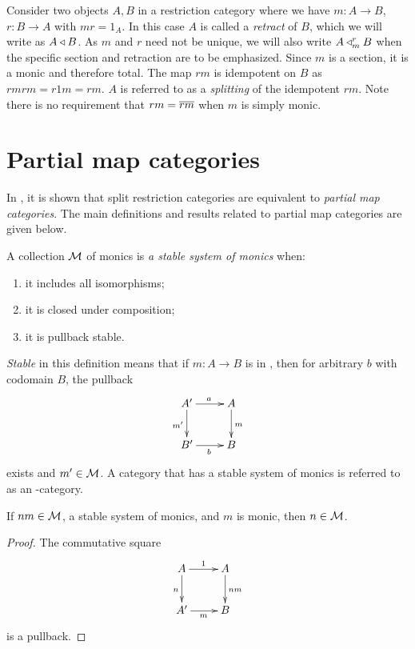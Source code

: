 Consider two objects $A, B$
in a restriction category where we have $m: A\to B$, $r:B \to A$ with $m r = 1_A$. In this case
$A$ is called a \emph{retract} of $B$, which we will write as $A\triangleleft B$. As $m$ and $r$ need
not be unique, we will also write $A \triangleleft_{m}^{r} B$ when the specific section and retraction
are to be emphasized. Since $m$ is a section, it is a monic and therefore total. The map $r m$ is
idempotent on $B$ as $r m r m = r 1 m = r m$. $A$ is referred to as a \emph{splitting} of the
idempotent $r m$. Note there is no requirement that $r m = \overline{r m}$ when $m$ is simply monic.




\section{Partial map categories} %
\label{sub:partial_map_categories}

In \cite{cockett2002:restcategories1}, it is shown that split restriction categories are
equivalent to \emph{partial map categories}. The main definitions and results related to
partial map categories are given below.

\begin{definition}
  A collection $\mathcal{M}$ of monics is \emph{a stable system of monics}
  when:
  \begin{enumerate}[{(}i{)}]
    \item it includes all isomorphisms;
    \item it is closed under composition;
    \item it is pullback stable.
  \end{enumerate}
\end{definition}

\emph{Stable} in this definition means that if $m:A\to B$ is in \Mstab, then for arbitrary
$b$ with codomain $B$, the pullback
\[
  \xymatrix{
    A'\ar[r]^a \ar[d]_{m'} &A\ar[d]^{m}\\
    B' \ar[r]_{b} & B
  }
\]
exists and $m' \in \mathcal{M}$. A category that has a stable system of monics
is referred to as an \Mstab-category.

\begin{lemma}
  If $n m \in \mathcal{M}$, a stable system of monics, and $m$ is monic, then $n \in \mathcal{M}$.
\end{lemma}
\begin{proof}
  The commutative square
  \[
    \xymatrix{
      A\ar[d]_n \ar[r]^{1} &A\ar[d]^{n m}\\
      A' \ar[r]_{m} & B
    }
  \]
  is a pullback.
\end{proof}

